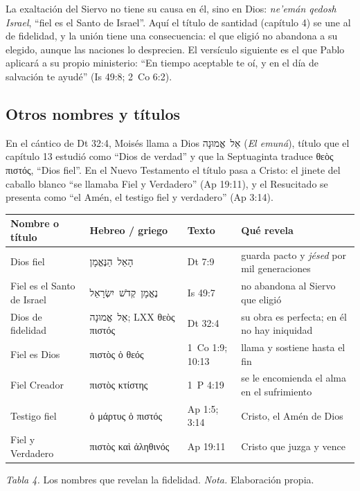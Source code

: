 \documentclass[11pt,letterpaper]{article}
\newcommand{\heb}[1]{\mbox{\foreignlanguage{hebrew}{#1}}}
\newcommand{\grc}[1]{\foreignlanguage{ancientgreek}{#1}}
\begin{document}
La exaltación del Siervo no tiene su causa en él, sino en Dios: \emph{ne'emán qedosh Israel}, ``fiel es el Santo de Israel''. Aquí el título de santidad (capítulo 4) se une al de fidelidad, y la unión tiene una consecuencia: el que eligió no abandona a su elegido, aunque las naciones lo desprecien. El versículo siguiente es el que Pablo aplicará a su propio ministerio: ``En tiempo aceptable te oí, y en el día de salvación te ayudé'' (Is 49:8; 2~Co 6:2).

\subsection{Otros nombres y títulos}
En el cántico de Dt 32:4, Moisés llama a Dios \heb{אֵל אֱמוּנָה} (\emph{El emuná}), título que el capítulo 13 estudió como ``Dios de verdad'' y que la Septuaginta traduce \grc{θεὸς πιστός}, ``Dios fiel''. En el Nuevo Testamento el título pasa a Cristo: el jinete del caballo blanco ``se llamaba Fiel y Verdadero'' (Ap 19:11), y el Resucitado se presenta como ``el Amén, el testigo fiel y verdadero'' (Ap 3:14).

\begin{center}\small\renewcommand{\arraystretch}{1.22}
\begin{tabular}{@{}L{3.2cm}L{3.6cm}L{2.6cm}L{5.0cm}@{}}
\toprule
\textbf{Nombre o título} & \textbf{Hebreo / griego} & \textbf{Texto} & \textbf{Qué revela} \\ \midrule
Dios fiel & \heb{הָאֵל הַנֶּאֱמָן} & Dt 7:9 & guarda pacto y \emph{jésed} por mil generaciones \\
Fiel es el Santo de Israel & \heb{נֶאֱמָן קְדֹשׁ יִשְׂרָאֵל} & Is 49:7 & no abandona al Siervo que eligió \\
Dios de fidelidad & \heb{אֵל אֱמוּנָה}; LXX \grc{θεὸς πιστός} & Dt 32:4 & su obra es perfecta; en él no hay iniquidad \\
Fiel es Dios & \grc{πιστὸς ὁ θεός} & 1~Co 1:9; 10:13 & llama y sostiene hasta el fin \\
Fiel Creador & \grc{πιστὸς κτίστης} & 1~P 4:19 & se le encomienda el alma en el sufrimiento \\
Testigo fiel & \grc{ὁ μάρτυς ὁ πιστός} & Ap 1:5; 3:14 & Cristo, el Amén de Dios \\
Fiel y Verdadero & \grc{πιστὸς καὶ ἀληθινός} & Ap 19:11 & Cristo que juzga y vence \\
\bottomrule
\end{tabular}\par
{\footnotesize\color{gris}\textit{Tabla 4.} Los nombres que revelan la fidelidad. \textit{Nota.} Elaboración propia.}
\end{center}
\end{document}
